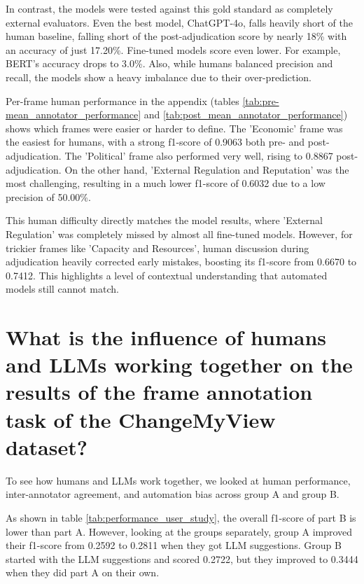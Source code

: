 \documentclass[
10pt, %
a4paper, %
oneside, %
headinclude,footinclude, %
] {book}%
\begin{document}
In contrast, the models were tested against this gold standard as completely external evaluators. Even the best model, ChatGPT-4o, falls heavily short of the human baseline, falling short of the post-adjudication score by nearly 18\% with an accuracy of just 17.20\%. Fine-tuned models score even lower. For example, BERT's accuracy drops to 3.0\%. Also, while humans balanced precision and recall, the models show a heavy imbalance due to their over-prediction.

Per-frame human performance in the appendix (tables \ref{tab:pre-mean_annotator_performance} and \ref{tab:post_mean_annotator_performance}) shows which frames were easier or harder to define. The 'Economic' frame was the easiest for humans, with a strong f1-score of 0.9063 both pre- and post-adjudication. The 'Political' frame also performed very well, rising to 0.8867 post-adjudication. On the other hand, 'External Regulation and Reputation' was the most challenging, resulting in a much lower f1-score of 0.6032 due to a low precision of 50.00\%.

This human difficulty directly matches the model results, where 'External Regulation' was completely missed by almost all fine-tuned models. However, for trickier frames like 'Capacity and Resources', human discussion during adjudication heavily corrected early mistakes, boosting its f1-score from 0.6670 to 0.7412. This highlights a level of contextual understanding that automated models still cannot match.



\section{What is the influence of humans and LLMs working together on the results of the frame annotation task of the ChangeMyView dataset?}
To see how humans and LLMs work together, we looked at human performance, inter-annotator agreement, and automation bias across group A and group B.

As shown in table \ref{tab:performance_user_study}, the overall f1-score of part B is lower than part A. However, looking at the groups separately, group A improved their f1-score from 0.2592 to 0.2811 when they got LLM suggestions. Group B started with the LLM suggestions and scored 0.2722, but they improved to 0.3444 when they did part A on their own. 
\end{document}
